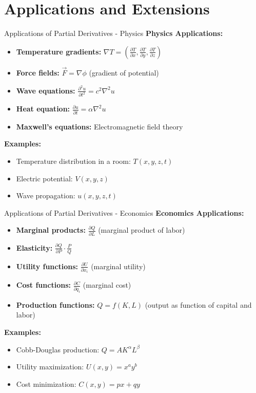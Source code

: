 \documentclass[aspectratio=169]{beamer}
\begin{document}
\section{Applications and Extensions}

\begin{frame}{Applications of Partial Derivatives - Physics}
\textbf{Physics Applications:}
\begin{itemize}
    \item \textbf{Temperature gradients:} $\nabla T = \left(\frac{\partial T}{\partial x}, \frac{\partial T}{\partial y}, \frac{\partial T}{\partial z}\right)$
    \item \textbf{Force fields:} $\vec{F} = \nabla \phi$ (gradient of potential)
    \item \textbf{Wave equations:} $\frac{\partial^2 u}{\partial t^2} = c^2\nabla^2 u$
    \item \textbf{Heat equation:} $\frac{\partial u}{\partial t} = \alpha \nabla^2 u$
    \item \textbf{Maxwell's equations:} Electromagnetic field theory
\end{itemize}

\textbf{Examples:}
\begin{itemize}
    \item Temperature distribution in a room: $T(x,y,z,t)$
    \item Electric potential: $V(x,y,z)$
    \item Wave propagation: $u(x,y,z,t)$
\end{itemize}
\end{frame}

\begin{frame}{Applications of Partial Derivatives - Economics}
\textbf{Economics Applications:}
\begin{itemize}
    \item \textbf{Marginal products:} $\frac{\partial Q}{\partial L}$ (marginal product of labor)
    \item \textbf{Elasticity:} $\frac{\partial Q}{\partial P} \cdot \frac{P}{Q}$
    \item \textbf{Utility functions:} $\frac{\partial U}{\partial x_i}$ (marginal utility)
    \item \textbf{Cost functions:} $\frac{\partial C}{\partial q_i}$ (marginal cost)
    \item \textbf{Production functions:} $Q = f(K,L)$ (output as function of capital and labor)
\end{itemize}

\textbf{Examples:}
\begin{itemize}
    \item Cobb-Douglas production: $Q = AK^\alpha L^\beta$
    \item Utility maximization: $U(x,y) = x^a y^b$
    \item Cost minimization: $C(x,y) = px + qy$
\end{itemize}
\end{frame}
\end{document}
